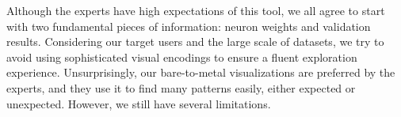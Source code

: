 \documentclass[format=acmsmall, review=false, screen=true]{acmart}
\newcommand{\name}{{DeepTracker}\xspace}
\newcommand{\dy}{\textcolor[rgb]{0,0,0}}
\begin{document}
Although the experts have high expectations of this tool, we all agree to start with two fundamental pieces of information: neuron weights and validation results.
Considering our target users and the large scale of datasets, we try to avoid using sophisticated visual encodings to ensure a fluent exploration experience.
Unsurprisingly, our bare-to-metal visualizations are preferred by the experts, and they use it to find many patterns easily, either expected or unexpected.
However, we still have several limitations.
\end{document}
